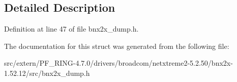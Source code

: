 \subsection{Detailed Description}


Definition at line 47 of file bnx2x\_\-dump.h.



The documentation for this struct was generated from the following file:\begin{DoxyCompactItemize}
\item 
src/extern/PF\_\-RING-\/4.7.0/drivers/broadcom/netxtreme2-\/5.2.50/bnx2x-\/1.52.12/src/bnx2x\_\-dump.h\end{DoxyCompactItemize}
